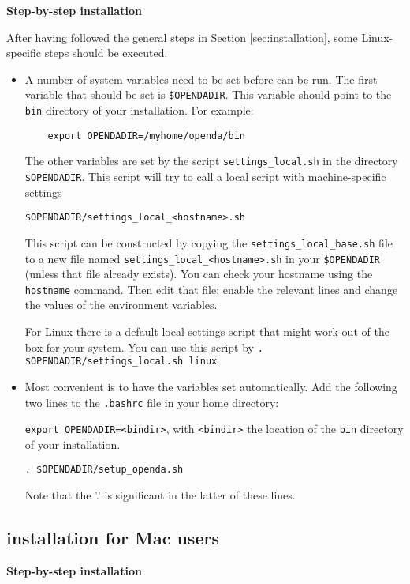 \textbf{Step-by-step installation}

After having followed the general steps in Section \ref{sec:installation}, some Linux-specific steps should be executed.
\begin{itemize}
\item
A number of system variables need to be set before \oda can be run. The first variable that should be set is 
\verb|$OPENDADIR|. This variable should point to the \verb|bin| directory of your \oda installation. For example:
\begin{verbatim}
    export OPENDADIR=/myhome/openda/bin
\end{verbatim}
		
The other variables are set by the script \verb|settings_local.sh| in the directory \verb|$OPENDADIR|. This script will try to call a local script with machine-specific settings 
\begin{verbatim}
$OPENDADIR/settings_local_<hostname>.sh
\end{verbatim}
This script can be constructed by copying the \verb|settings_local_base.sh| file to a new file named \verb|settings_local_<hostname>.sh| in your \verb|$OPENDADIR| (unless that file already exists). You can check your hostname using the \verb|hostname| command. Then edit that file: enable the relevant lines and change the values of the environment variables.

For Linux there is a default local-settings script that might work out of the box for your system. You can use this script by
\verb|. $OPENDADIR/settings_local.sh linux|
\item
Most convenient is to have the variables set automatically. Add the following two lines to the \verb|.bashrc| file in your home directory:

\verb|export OPENDADIR=<bindir>|, with \verb|<bindir>| the location of the \verb|bin| directory of your \oda installation.

\verb|. $OPENDADIR/setup_openda.sh|

Note that the '.' is significant in the latter of these lines.
\end{itemize}

\subsection{\oda installation for Mac users}
\textbf{Step-by-step installation}

